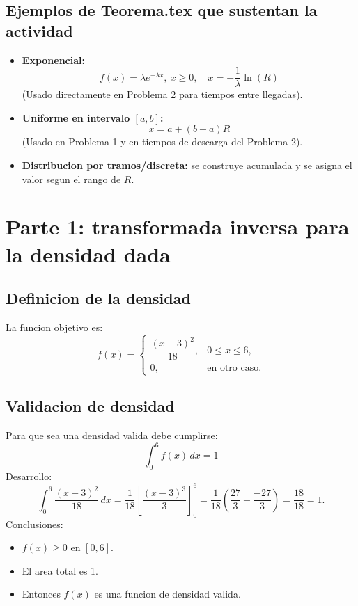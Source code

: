 \documentclass[12pt,a4paper]{article}
\begin{document}
\subsection{Ejemplos de Teorema.tex que sustentan la actividad}
\begin{itemize}
  \item \textbf{Exponencial:} 
  \[
  f(x)=\lambda e^{-\lambda x},\ x\ge 0,\quad x=-\frac{1}{\lambda}\ln(R)
  \]
  (Usado directamente en Problema 2 para tiempos entre llegadas).

  \item \textbf{Uniforme en intervalo $[a,b]$:}
  \[
  x=a+(b-a)R
  \]
  (Usado en Problema 1 y en tiempos de descarga del Problema 2).

  \item \textbf{Distribucion por tramos/discreta:}
  se construye acumulada y se asigna el valor segun el rango de $R$.
\end{itemize}

\section{Parte 1: transformada inversa para la densidad dada}

\subsection{Definicion de la densidad}
La funcion objetivo es:
\[
f(x)=
\begin{cases}
\dfrac{(x-3)^2}{18}, & 0\le x\le 6,\\
0, & \text{en otro caso.}
\end{cases}
\]

\subsection{Validacion de densidad}
Para que sea una densidad valida debe cumplirse:
\[
\int_0^6 f(x)\,dx = 1
\]
Desarrollo:
\[
\int_0^6 \frac{(x-3)^2}{18}\,dx
=\frac{1}{18}\left[\frac{(x-3)^3}{3}\right]_0^6
=\frac{1}{18}\left(\frac{27}{3}-\frac{-27}{3}\right)
=\frac{18}{18}=1.
\]
Conclusiones:
\begin{itemize}
  \item $f(x)\ge 0$ en $[0,6]$.
  \item El area total es 1.
  \item Entonces $f(x)$ es una funcion de densidad valida.
\end{itemize}
\end{document}
